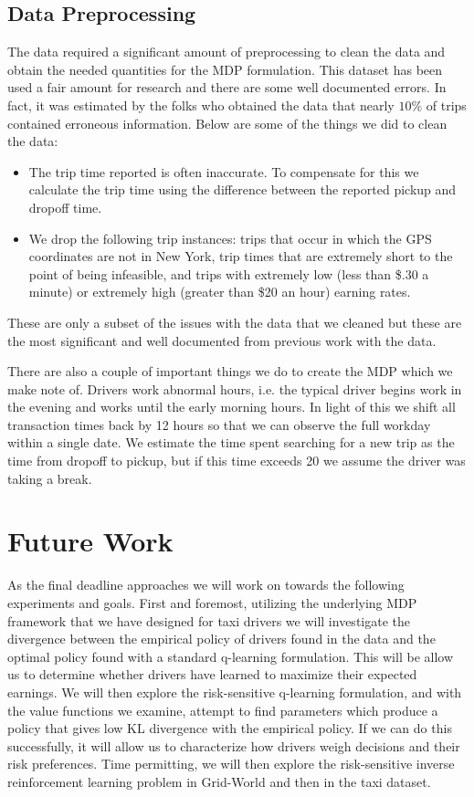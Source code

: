 \documentclass{article}
\begin{document}
\subsection{Data Preprocessing}
The data required a significant amount of preprocessing to clean the data and obtain the needed quantities for the MDP formulation. This dataset has been used a fair amount for research and there are some well documented errors. In fact, it was estimated by the folks who obtained the data that nearly $10\%$ of trips contained erroneous information. Below are some of the things we did to clean the data:
\begin{itemize}
\item The trip time reported is often inaccurate. To compensate for this we calculate the trip time using the difference between the reported pickup and dropoff time.
\item We drop the following trip instances: trips that occur in which the GPS coordinates are not in New York, trip times that are extremely short to the point of being infeasible, and trips with extremely low (less than \$.30 a minute) or extremely high (greater than \$20 an hour) earning rates.
\end{itemize}
These are only a subset of the issues with the data that we cleaned but these are the most significant and well documented from previous work with the data. 

There are also a couple of important things we do to create the MDP which we make note of. Drivers work abnormal hours, i.e. the typical driver begins work in the evening and works until the early morning hours. In light of this we shift all transaction times back by 12 hours so that we can observe the full workday within a single date. We estimate the time spent searching for a new trip as the time from dropoff to pickup, but if this time exceeds 20 we assume the driver was taking a break.
\section{Future Work}
As the final deadline approaches we will work on towards the following experiments and goals. First and foremost, utilizing the underlying MDP framework that we have designed for taxi drivers we will investigate the divergence between the empirical policy of drivers found in the data and the optimal policy found with a standard q-learning formulation. This will be allow us to determine whether drivers have learned to maximize their expected earnings. We will then explore the risk-sensitive q-learning formulation, and with the value functions we examine, attempt to find parameters which produce a policy that gives low KL divergence with the empirical policy. If we can do this successfully, it will allow us to characterize how drivers weigh decisions and their risk preferences. Time permitting, we will then explore the risk-sensitive inverse reinforcement learning problem in Grid-World and then in the taxi dataset. 
\end{document}
